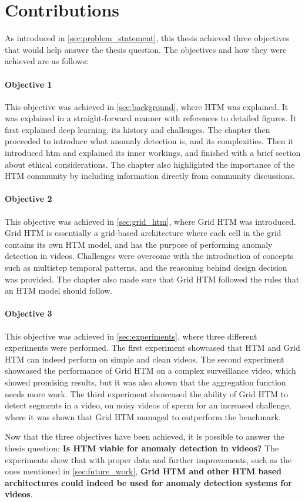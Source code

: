 \section{Contributions}
As introduced in \autoref{sec:problem_statement}, this thesis achieved three objectives that would help answer the thesis question. The objectives and how they were achieved are as follows:
\par
\paragraph*{Objective 1} \emph{}
\par
This objective was achieved in \autoref{sec:background}, where HTM was explained. It was explained in a straight-forward manner with references to detailed figures. It first explained deep learning, its history and challenges. The chapter then proceeded to introduce what anomaly detection is, and its complexities. Then it introduced \gls*{htm} and explained its inner workings, and finished with a brief section about ethical considerations. The chapter also highlighted the importance of the HTM community by including information directly from community discussions.
\paragraph*{Objective 2} \emph{}
\par
This objective was achieved in \autoref{sec:grid_htm}, where Grid HTM was introduced. Grid HTM is essentially a grid-based architecture where each cell in the grid contains its own HTM model, and has the purpose of performing anomaly detection in videos. Challenges were overcome with the introduction of concepts such as multistep temporal patterns, and the reasoning behind design decision was provided. The chapter also made sure that Grid HTM followed the rules that an HTM model should follow.
\paragraph*{Objective 3} \emph{}
\par
This objective was achieved in \autoref{sec:experiments}, where three different experiments were performed. The first experiment showcased that HTM and Grid HTM can indeed perform on simple and clean videos. The second experiment showcased the performance of Grid HTM on a complex surveillance video, which showed promising results, but it was also shown that the aggregation function needs more work. The third experiment showcased the ability of Grid HTM to detect segments in a video, on noisy videos of sperm for an increased challenge, where it was shown that Grid HTM managed to outperform the benchmark.
\par
Now that the three objectives have been achieved, it is possible to answer the thesis question: \textbf{Is HTM viable for anomaly detection in videos?} The experiments show that with proper data and further improvements, such as the ones mentioned in \autoref{sec:future_work}, \textbf{Grid HTM and other HTM based architectures could indeed be used for anomaly detection systems for videos}.
